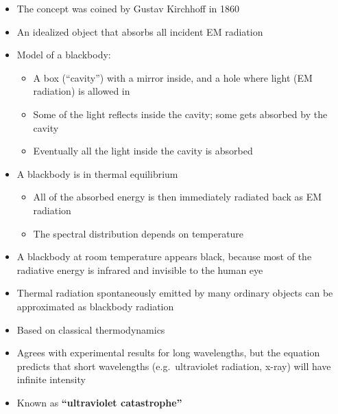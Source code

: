 \begin{itemize}
\item The concept was coined by Gustav Kirchhoff in 1860
\item An idealized object that absorbs all incident EM radiation
\item Model of a blackbody:
  \begin{itemize}
  \item A box (``cavity'') with a mirror inside, and a hole where
    light (EM radiation) is allowed in
  \item Some of the light reflects inside the cavity; some gets absorbed
    by the cavity
  \item Eventually all the light inside the cavity is absorbed
  \end{itemize}

%    

\item A blackbody is in thermal equilibrium
  \begin{itemize}
  \item All of the absorbed energy is then immediately radiated back as EM
    radiation
  \item The spectral distribution depends on temperature
  \end{itemize}
\item A blackbody at room temperature appears black, because most of the
  radiative energy is infrared and invisible to the human eye
\item Thermal radiation spontaneously emitted by many ordinary objects can
  be approximated as blackbody radiation 
\end{itemize}
%  
%
%
%
%
%  
\begin{itemize}
\item Based on classical thermodynamics
\item Agrees with experimental results for long wavelengths, but the
  equation predicts that short wavelengths (e.g.\ ultraviolet radiation,
  x-ray) will have infinite intensity
\item Known as \textbf{``ultraviolet catastrophe''}
\end{itemize}
%
  



